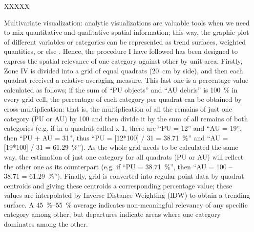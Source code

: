 \begin{labeling}{XXXXX}
\item[Multivariate visualization:] analytic visualizations are valuable tools when we need to mix quantitative and qualitative spatial information; this way, the graphic plot of different variables or categories can be represented as trend surfaces, weighted quantities, or else \parencite{Craig_2006}. Hence, the procedure I have followed has been designed to express the spatial relevance of one category against other by unit area. Firstly, Zone IV is divided into a grid of equal quadrats (\SI{20}{\centi\meter} by side), and then each quadrat received a relative averaging measure. This last one is a percentage value calculated as follows; if the sum of “PU objects” and “AU debris” is \SI{100}{\percent} in every grid cell, the percentage of each category per quadrat can be obtained by cross-multiplication: that is, the multiplication of all the remains of just one category (PU or AU) by 100 and then divide it by the sum of all remains of both categories (e.g. if in a quadrat called x-1, there are “PU = 12” and “AU = 19”, then “PU + AU = 31”, thus “PU = [12*100] / 31 = \SI{38.71}{\percent}” and “AU = [19*100] / 31 = \SI{61.29}{\percent}”). As the whole grid needs to be calculated the same way, the estimation of just one category for all quadrats (PU or AU) will reflect the other one as its counterpart (e.g. if “PU = \SI{38.71}{\percent}”, then “AU = 100 – 38.71 = \SI{61.29}{\percent}”). Finally, grid is converted into regular point data by quadrat centroids and giving these centroids a corresponding percentage value; these values are interpolated by Inverse Distance Weighting (IDW) to obtain a trending surface. A \SIrange{45}{55}{\percent} average indicates non-meaningful relevancy of any specific category among other, but departures indicate areas where one category dominates among the other.  
\end{labeling}
%
